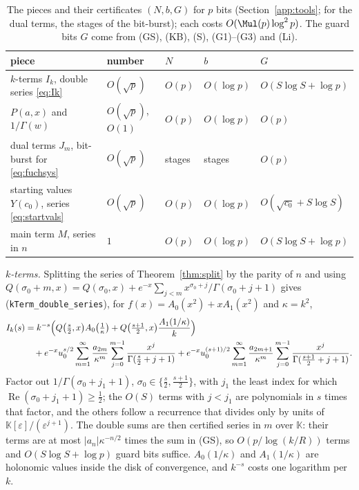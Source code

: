 \begin{small}
\begin{table}[ht]
\centering\footnotesize
\caption{The pieces and their certificates $(N, b, G)$ for $p$ bits (Section~\ref{app:tools}; for the dual terms, the stages of the bit-burst); each costs $O(\Mul(p)\log^2p)$. The guard bits $G$ come from (GS), (KB), (S), (G1)--(G3) and (Li).}
\label{tab:certificates}
\begin{tabular}{@{}lllll@{}}
\toprule
piece & number & $N$ & $b$ & $G$ \\
\midrule
$k$-terms $I_k$, double series \eqref{eq:Ik} & $O(\sqrt p)$ & $O(p)$ & $O(\log p)$ & $O(S\log S + \log p)$ \\
$P(a, x)$ and $1/\Gamma(w)$ & $O(\sqrt p)$, $O(1)$ & $O(p)$ & $O(\log p)$ & $O(p)$ \\
dual terms $J_m$, bit-burst for \eqref{eq:fuchsys} & $O(\sqrt p)$ & stages & stages & $O(p)$ \\
starting values $Y(c_0)$, series \eqref{eq:startvals} & $O(\sqrt p)$ & $O(p)$ & $O(\log p)$ & $O(\sqrt{c_0} + S\log S)$ \\
main term $M$, series in $n$ & $1$ & $O(p)$ & $O(\log p)$ & $O(S\log S + \log p)$ \\
\bottomrule
\end{tabular}
\end{table}

\emph{$k$-terms.}\label{app:kterms} Splitting the series of Theorem~\ref{thm:split} by the parity of $n$ and using
$Q(\sigma_0+m, x) = Q(\sigma_0, x) + e^{-x}\sum_{j<m}x^{\sigma_0+j}/\Gamma(\sigma_0+j+1)$ gives
(\nolinkurl{kTerm_double_series}), for
$f(x) = A_0(x^2) + xA_1(x^2)$ and $\kappa = k^2$,
\begin{equation}\label{eq:Ik}
\begin{split}
  I_k(s) &= k^{-s}\Bigl(Q\bigl(\tfrac s2, x\bigr)A_0\bigl(\tfrac1\kappa\bigr) + Q\bigl(\tfrac{s+1}2, x\bigr)\frac{A_1(1/\kappa)}{k}\Bigr) \\
  &\quad + e^{-x}u_0^{s/2}\sum_{m=1}^{\infty}\frac{a_{2m}}{\kappa^m}\sum_{j=0}^{m-1}\frac{x^j}{\Gamma(\frac s2+j+1)}
   + e^{-x}u_0^{(s+1)/2}\sum_{m=1}^{\infty}\frac{a_{2m+1}}{\kappa^m}\sum_{j=0}^{m-1}\frac{x^j}{\Gamma(\frac{s+1}2+j+1)}.
\end{split}
\end{equation}
Factor out $1/\Gamma(\sigma_0 + j_1 + 1)$, $\sigma_0 \in \{\frac s2, \frac{s+1}2\}$, with $j_1$ the least index for
which $\operatorname{Re}(\sigma_0 + j_1 + 1) \ge \frac12$; the $O(S)$ terms with $j < j_1$ are polynomials in $s$
times that factor, and the others follow a recurrence that divides only by units of
$\mathbb K[\varepsilon]/(\varepsilon^{j+1})$. The double sums are then certified series in $m$ over $\mathbb K$: their
terms are at most $|a_n|\kappa^{-n/2}$ times the sum in (GS), so $O(p/\log(k/R))$ terms and $O(S\log S + \log p)$
guard bits suffice. $A_0(1/\kappa)$ and $A_1(1/\kappa)$ are holonomic values inside the disk of convergence, and
$k^{-s}$ costs one logarithm per $k$.


\end{small}

